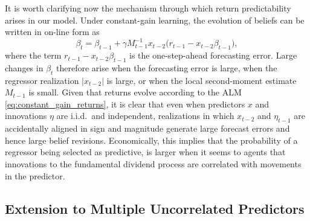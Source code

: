 It is worth clarifying now the mechanism through which return predictability arises in our model.
Under constant-gain learning, the evolution of beliefs can be written in on-line form as
\begin{equation}
\beta_t
=
\beta_{t-1}
+
\gamma M_{t-1}^{-1} x_{t-2}
\bigl(r_{t-1} - x_{t-2}\beta_{t-1}\bigr),
\end{equation}
where the term $r_{t-1} - x_{t-2}\beta_{t-1}$ is the one-step-ahead forecasting error.
Large changes in $\beta_t$ therefore arise when the forecasting error is large, when the regressor realization $|x_{t-2}|$ is large, or when the local second-moment estimate $M_{t-1}$ is small.
Given that returns evolve according to the ALM \eqref{eq:constant_gain_returns}, it is clear that 
even when predictors $x$ and innovations $\eta$ are i.i.d.\ and independent, realizations in which $x_{t-2}$ and $\eta_{t-1}$ are accidentally aligned in sign and magnitude generate large forecast errors and hence large belief revisions.
Economically, this implies that the probability of a regressor being selected as predictive, is larger when it seems to agents that innovations to the fundamental dividend process are correlated with movements in the predictor.

\subsection{Extension to Multiple Uncorrelated Predictors}


